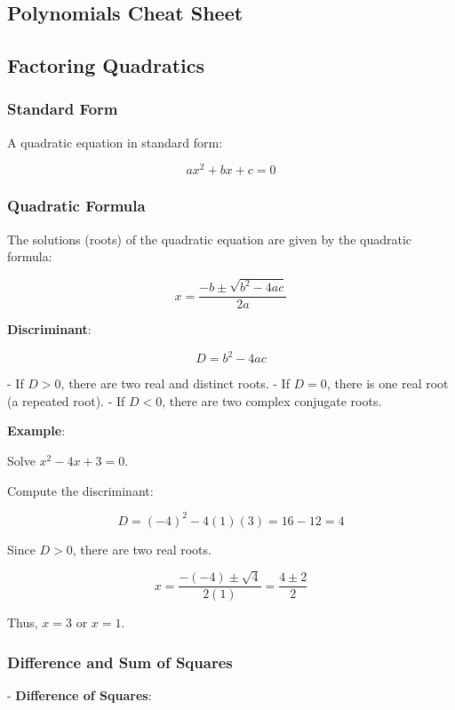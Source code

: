 \documentclass{article}
\begin{document}
\begin{multicols}{2}

\section*{Polynomials Cheat Sheet}

\subsection*{Factoring Quadratics}

\subsubsection*{Standard Form}

A quadratic equation in standard form:

\[
ax^2 + bx + c = 0
\]

\subsubsection*{Quadratic Formula}

The solutions (roots) of the quadratic equation are given by the quadratic formula:

\[
x = \frac{-b \pm \sqrt{b^2 - 4ac}}{2a}
\]

\textbf{Discriminant}:

\[
D = b^2 - 4ac
\]

- If \( D > 0 \), there are two real and distinct roots.
- If \( D = 0 \), there is one real root (a repeated root).
- If \( D < 0 \), there are two complex conjugate roots.

\textbf{Example}:

Solve \( x^2 - 4x + 3 = 0 \).

Compute the discriminant:

\[
D = (-4)^2 - 4(1)(3) = 16 - 12 = 4
\]

Since \( D > 0 \), there are two real roots.

\[
x = \frac{-(-4) \pm \sqrt{4}}{2(1)} = \frac{4 \pm 2}{2}
\]

Thus, \( x = 3 \) or \( x = 1 \).

\subsubsection*{Difference and Sum of Squares}

- \textbf{Difference of Squares}:


\end{multicols}
\end{document}
